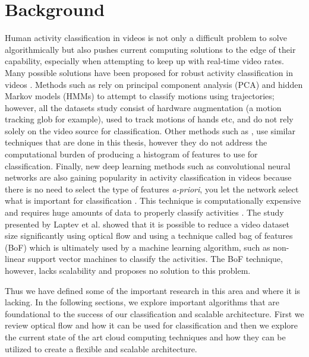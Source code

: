 \chapter{Background}
Human activity classification in videos is not only a difficult problem to solve
algorithmically but also pushes current computing solutions to the edge of their
capability, especially when attempting to keep up with real-time video rates.
Many possible solutions have been proposed for robust activity classification in
videos \cite{niebles2010modeling} \cite{bashir2007object}
\cite{ribeiro2005human} \cite{karpathy2014large}. Methods such as
\cite{bashir2007object} rely on principal component analysis (PCA) and hidden
Markov models (HMMs) to attempt to classify motions using trajectories; however,
all the datasets study consist of hardware augmentation (a motion tracking glob for
example), used to track motions of hands etc, and do not rely solely on the
video source for classification. Other methods such as
\cite{niebles2010modeling}, use similar techniques that are done in this thesis,
however they do not address the computational burden of producing a histogram of
features to use for classification. Finally, new deep learning methods such as
convolutional neural networks are also gaining popularity in activity
classification in videos because there is no need to select the type of features
\textit{a-priori}, you let the network select what is important for
classification \cite{karpathy2014large}. This technique is computationally
expensive and requires huge amounts of data to properly classify activities
\cite{karpathy2014large}. The study presented by Laptev et al.
\cite{laptev2008learning} showed that it is possible to reduce a video dataset
size significantly using optical flow and using a technique called bag of
features (BoF) which is ultimately used by a machine learning algorithm, such as
non-linear support vector machines to classify the activities. The BoF
technique, however, lacks scalability and proposes no solution to this problem.

Thus we have defined some of the important research in this area and where it is
lacking. In the following sections, we explore important algorithms that are
foundational to the success of our classification and scalable architecture.
First we review optical flow and how it can be used for classification and then
we explore the current state of the art cloud computing techniques and how they
can be utilized to create a flexible and scalable architecture.



